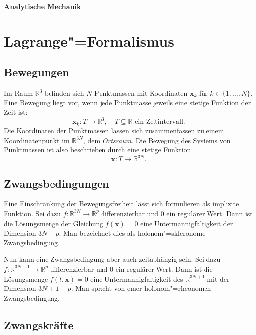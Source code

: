 \documentclass[a4paper,10pt,fleqn,twocolumn,twoside,dvipdfmx]{scrartcl}
\numberwithin{equation}{section}
\newcommand{\bvec}[1]{\mathbf{#1}}
\newcommand{\R}{\mathbb R}
\begin{document}
\thispagestyle{empty}

\begin{huge}
\noindent
\textbf{Analytische Mechanik}
\par
\end{huge}
\vspace{1em}

\tableofcontents

\section{Lagrange"=Formalismus}

\subsection{Bewegungen}

Im Raum $\R^3$ befinden sich $N$ Punktmassen mit Koordinaten
$\bvec x_k$ für $k\in\{1,\ldots,N\}$. Eine Bewegung liegt vor,
wenn jede Punktmasse jeweils eine stetige Funktion der Zeit ist:
\begin{equation}
\bvec x_k\colon T\to\R^3, \quad\text{$T\subseteq\R$ ein Zeitintervall}.
\end{equation}
Die Koordinaten der Punktmassen lassen sich zusammenfassen zu einem
Koordinatenpunkt im $\R^{3N}$, dem \emph{Ortsraum}. Die Bewegung des
Systems von Punktmassen ist also beschrieben durch eine stetige
Funktion
\begin{equation}
\bvec x\colon T\to\R^{3N}.
\end{equation}

\subsection{Zwangsbedingungen}

Eine Einschränkung der Bewegungsfreiheit lässt sich formulieren
als implizite Funktion. Sei dazu $f\colon\R^{3N}\to\R^p$
differenzierbar und $0$ ein regulärer Wert. Dann ist die Lösungsmenge
der Gleichung $f(\bvec x)=0$ eine Untermannigfaltigkeit der Dimension
$3N-p$. Man bezeichnet dies als holonom"=skleronome Zwangsbedingung.

Nun kann eine Zwangsbedingung aber auch zeitabhängig sein. Sei dazu
$f\colon\R^{3N+1}\to\R^p$ differenzierbar und $0$ ein regulärer Wert.
Dann ist die Lösungsmenge $f(t,\bvec x)=0$ eine Untermannigfaltigkeit
des $\R^{3N+1}$ mit der Dimension $3N+1-p$. Man spricht von einer
holonom"=rheonomen Zwangsbedingung.

\subsection{Zwangskräfte}
\end{document}
